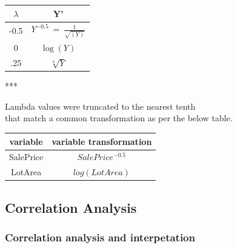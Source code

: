 \documentclass[]{article}
\newenvironment{Shaded}{\begin{snugshade}}{\end{snugshade}}
\newcommand{\KeywordTok}[1]{\textcolor[rgb]{0.13,0.29,0.53}{\textbf{{#1}}}}
\newcommand{\DataTypeTok}[1]{\textcolor[rgb]{0.13,0.29,0.53}{{#1}}}
\newcommand{\DecValTok}[1]{\textcolor[rgb]{0.00,0.00,0.81}{{#1}}}
\newcommand{\StringTok}[1]{\textcolor[rgb]{0.31,0.60,0.02}{{#1}}}
\newcommand{\NormalTok}[1]{{#1}}
\begin{document}
\setlength{\tabcolsep}{12pt}

\begin{tabular}{ c c }
\hline
$\lambda$ & Y' \\ \hline
-0.5 &  $Y^{-0.5}~=~\frac{1}{\sqrt{(Y)}}$ \\
0   & $\log(Y)$ \\
.25  & $\sqrt[4]{Y}$
\end{tabular}

\justifying
*** \centering

Lambda values were truncated to the nearest tenth\\
that match a common transformation as per the below table.

\begin{tabular}{ c c }
\hline
variable & variable transformation \\ \hline
SalePrice & $SalePrice^{-0.5}$ \\
LotArea & $log(LotArea)$ 
\end{tabular}

\justifying

\setlength{\tabcolsep}{6pt}

\newpage

\subsection{Correlation Analysis}\label{correlation-analysis}

\subsubsection{Correlation analysis and
interpetation}\label{correlation-analysis-and-interpetation}

\begin{Shaded}
\end{Shaded}
\end{document}
